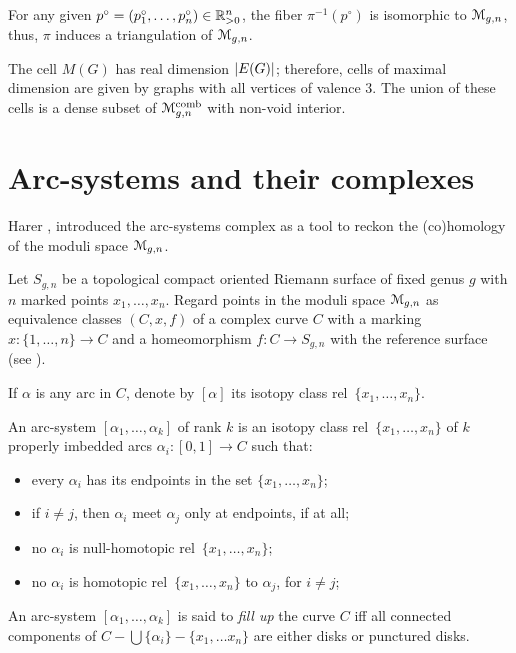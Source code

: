 For any given $p^\circ = (p_1^\circ, \ldots, p_n^\circ) \in \mathbb{R}_{>0}^n$, the fiber
$\pi^{-1}(p^\circ)$ is isomorphic to $\mathcal{M}_{g,n}$, thus, $\pi$ induces a
triangulation of $\mathcal{M}_{g,n}$.

The cell $M(G)$ has real dimension $\lvert E(G)\rvert$; therefore,
cells of maximal dimension are given by graphs with all vertices of
valence $3$. The union of these cells is a dense subset of
$\mathcal{M}\sp{\text{comb}}_{g,n}$ with non-void interior.



\section{Arc-systems and their complexes}
\label{sec:arc-systems}

Harer \cite{harer;cohomological-dimension}, introduced the arc-systems
complex as a tool to reckon the (co)homology of the moduli space
$\mathcal{M}_{g,n}$.

Let $S_{g,n}$ be a topological compact oriented Riemann surface of
fixed genus $g$ with $n$ marked points $x_1, \ldots, x_n$.  Regard points
in the moduli space $\mathcal{M}_{g,n}$ as equivalence classes $(C,x,f)$ of a
complex curve $C$ with a marking $x:\{1,\ldots,n\}\to C$ and a homeomorphism
$f:C\to S_{g,n}$ with the reference surface (see
).

If $\alpha$ is any arc in $C$, denote by $[\alpha]$ its isotopy class rel~$\{x_1,
\ldots, x_n\}$.

\begin{definition}
  An arc-system $[\alpha_1, \ldots, \alpha_k]$ of rank $k$ is an isotopy class
  rel~$\{x_1, \ldots, x_n\}$ of $k$ properly imbedded arcs $\alpha_i : [0,1] \to C$
  such that:
  \begin{itemize}
  \item every $\alpha_i$ has its endpoints in the set $\{x_1, \ldots, x_n\}$;
  \item if $i \neq j$, then $\alpha_i$ meet $\alpha_j$ only at endpoints, if at all;
  \item no $\alpha_i$ is null-homotopic rel~$\{x_1, \ldots, x_n\}$;
  \item no $\alpha_i$ is homotopic rel~$\{x_1, \ldots, x_n\}$ to $\alpha_j$, for $i \neq
    j$;
  \end{itemize}
  An arc-system $[\alpha_1, \ldots, \alpha_k]$ is said to \emph{fill up} the curve
  $C$ iff all connected components of $C - \bigcup\{\alpha_i\} - \{x_1,\ldots x_n\}$ are
  either disks or punctured disks.
\end{definition}


